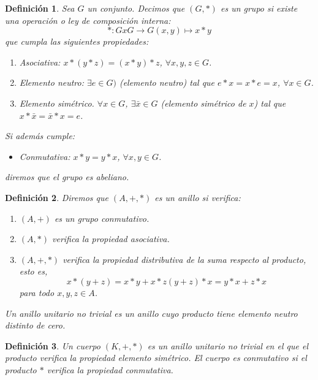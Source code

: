 \documentclass[a4paper,11pt, oneside]{book}
\newtheorem{defi}{Definición}
\begin{document}
\begin{defi}
	Sea $G$ un conjunto. Decimos que $(G,*)$ es un grupo si existe una operación o ley de composición interna:
	\begin{equation}
	*: GxG \rightarrow G
	(x,y) \mapsto x*y
	\end{equation}
	que cumpla las siguientes propiedades:
	\begin{enumerate}
		\item Asociativa: $ x*(y*z) = (x*y)*z$, $\forall x,y,z \in G$.
		\item Elemento neutro: $\exists e \in G)$ (elemento neutro) tal que $e*x = x*e = x$, $\forall x \in G$.
		\item Elemento simétrico. $\forall x \in G$, $\exists \bar{x} \in G$ (elemento simétrico de $x$) tal que $x*\bar{x} = \bar{x}*x= e$.
	\end{enumerate}
	Si además cumple:
	\begin{itemize}
		\item Conmutativa: $x*y = y*x$, $\forall x,y \in G$.
	\end{itemize}
	diremos que el grupo es abeliano.
\end{defi}
\begin{defi}
	Diremos que $(A, +, *)$ es un anillo si verifica:
	\begin{enumerate}
	\item $(A, +)$ es un grupo conmutativo.	
	\item $(A, *)$ verifica la propiedad asociativa.
	\item $(A, +, *)$ verifica la propiedad distributiva de la suma respecto al producto, esto es,
	\begin{equation}
	x*(y+z) = x*y +x*z 
	(y+z)*x = y*x + z*x
	\end{equation}
	para todo $x,y,z \in A$.
	\end{enumerate}
	Un anillo unitario no trivial es un anillo cuyo producto tiene elemento neutro distinto de cero.
\end{defi}
\begin{defi}
	Un cuerpo $(K, +, *)$ es un anillo unitario no trivial en el que el producto verifica la propiedad elemento simétrico. El cuerpo es conmutativo si el producto $*$ verifica la propiedad conmutativa.
\end{defi}
\end{document}
